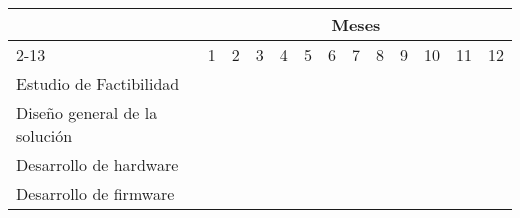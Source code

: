 \begin{table}[h]
\begin{center}
\begin{tabular}{|l|l|l|l|l|l|l|l|l|l|l|l|l|}
\hline
\multicolumn{1}{|c|}{} & \multicolumn{12}{c|}{Meses} \\ \cline{2-13} 
\multicolumn{1}{|c|}
    {\multirow{-2}{*}{Tareas}} 
    & 1 & 2 & 3 & 4 & 5 & 6 & 7 & 8 & 9 & 10 & 11 & 12 \\ \hline
Estudio de Factibilidad             &
\cellcolor[HTML]{656565}{\color[HTML]{333333}}  &
                                                &
                                                &
                                                &
                                                &
                                                &
                                                &
                                                &
                                                &
                                                & 
                                                & \\ \hline
Diseño general de la solución                &
                                                &
\cellcolor[HTML]{656565}{\color[HTML]{333333}}  &                      
\cellcolor[HTML]{656565}{\color[HTML]{333333}}  &
                                                &
                                                &
                                                &
                                                &
                                                &
                                                &
                                                &
                                                & \\ \hline
Desarrollo de hardware      &
                                                &
                                                &    
\cellcolor[HTML]{656565}{\color[HTML]{333333}}  &
\cellcolor[HTML]{656565}{\color[HTML]{333333}}  &
\cellcolor[HTML]{656565}{\color[HTML]{333333}}  &
\cellcolor[HTML]{656565}{\color[HTML]{333333}}  &
                                                &
                                                &
                                                &
                                                &
                                                & \\ \hline
Desarrollo de firmware               &
                                                &
                                                &
                                                &

\end{tabular}
\end{center}
\end{table}
